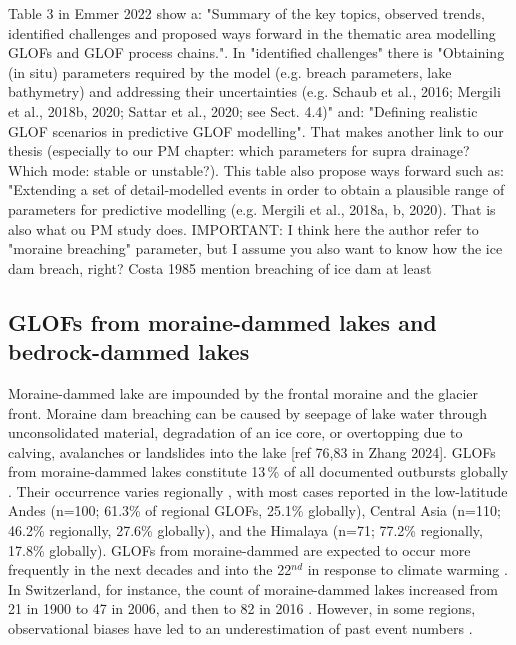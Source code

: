 Table 3 in Emmer 2022 show a: "Summary of the key topics, observed trends, identified challenges and proposed ways forward in the thematic area modelling GLOFs and GLOF process chains.". In "identified challenges" there is "Obtaining (in situ) parameters required by the model (e.g. breach parameters, lake bathymetry) and addressing their uncertainties (e.g. Schaub et al., 2016; Mergili et al., 2018b, 2020; Sattar et al., 2020; see Sect. 4.4)" and: "Defining realistic GLOF scenarios in predictive GLOF modelling". That makes another link to our thesis (especially to our PM chapter: which parameters for supra drainage? Which mode: stable or unstable?). 
This table also propose ways forward such as: "Extending a set of detail-modelled events in order to obtain a plausible range of parameters for predictive modelling (e.g. Mergili et al., 2018a, b, 2020). That is also what ou PM study does.
IMPORTANT: I think here the author refer to "moraine breaching" parameter, but I assume you also want to know how the ice dam breach, right? Costa 1985 mention breaching of ice dam at least

\subsection{GLOFs from moraine-dammed lakes and bedrock-dammed lakes}



Moraine-dammed lake are impounded by the frontal moraine and the glacier front. Moraine dam breaching can be caused by seepage of lake water through unconsolidated material, degradation of an ice core, or overtopping due to calving, avalanches or landslides into the lake [ref 76,83 in Zhang 2024]. GLOFs from moraine-dammed lakes constitute 13\,\% of all documented outbursts globally \citep{Lutzow&al2023}. Their occurrence varies regionally \citep{Zhang&al2024}, with most cases reported in the low-latitude Andes (n=100; 61.3\% of regional GLOFs, 25.1\% globally), Central Asia (n=110; 46.2\% regionally, 27.6\% globally), and the Himalaya (n=71; 77.2\% regionally, 17.8\% globally). GLOFs from moraine-dammed are expected to occur more frequently in the next decades and into the 22$^{nd}$ in response to climate warming \citep{Harrison&al2018}. In Switzerland, for instance, the count of moraine-dammed lakes increased from 21 in 1900 to 47 in 2006, and then to 82 in 2016 \cite{Zhang&al2024}. However, in some regions, observational biases have led to an underestimation of past event numbers \citep{Veh&al2022}. %


